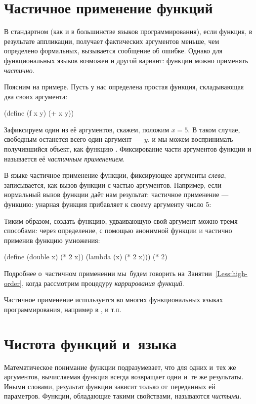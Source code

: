 \section[4]{Частичное применение функций}%
%
В стандартном \Racket (как и в большинстве языков программирования), если функция, в результате аппликации, получает фактических аргументов меньше, чем определено формальных, вызывается сообщение об ошибке. Однако для функциональных языков возможен и другой вариант: функции можно применять \emph{частично}.

Поясним на примере. Пусть у нас определена простая функция, складывающая два своих аргумента:

\begin{Definition}[emph={x,y}]
  (define (f x y)
    (+ x y))
\end{Definition}

Зафиксируем один из её аргументов, скажем, положим $x = 5$. В таком случае, свободным останется всего один аргумент~--- $y$, и мы можем воспринимать получившийся объект, как функцию . Фиксирование части аргументов функции и называется её \emph{частичным применением}.

В языке \Scheme частичное применение функции, фиксирующее аргументы \emph{слева}, записывается, как вызов функции с частью аргументов. Например, если нормальный вызов функции даёт нам результат:
 частичное применение --- функцию:
 унарная функция  прибавляет к своему аргументу число 5:

Тиким образом, создать функцию, удваивающую свой аргумент можно тремя способами: через определение, с помощью анонимной функции и частично применив функцию умножения:
\begin{SchemeCode}
  (define (double x) (* 2 x))
  (lambda (x) (* 2 x)))
  (* 2)
\end{SchemeCode}

Подробнее о~частичном применении мы~будем говорить на~Занятии~\ref{Less:high-order}, когда рассмотрим процедуру \emph{каррирования функций}.

Частичное применение используется во многих функциональных языках программирования, например в ,  и т.п.

\section{Чистота функций и~языка}%
Математическое понимание функции подразумевает, что для одних и~тех же аргументов, вычисляемая функция всегда возвращает одни и~те же результаты. Иными словами, результат функции зависит только от~переданных ей параметров. Функции, обладающие такими свойствами, называются \emph{чистыми}.

